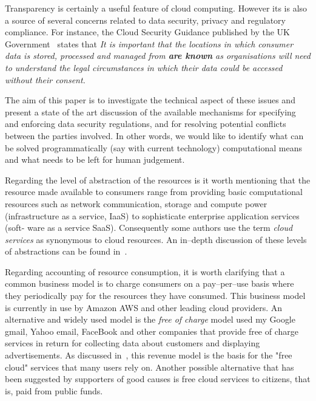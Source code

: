 \documentclass[runningheads,a4paper]{llncs}
\begin{document}
Transparency is certainly a useful feature of cloud computing. However
its is also a source of several concerns related to data security, privacy
and regulatory compliance. For instance, the Cloud Security Guidance
published by the UK Government~\cite{CSprinciples2014} states that
\emph{It is important that the locations in which consumer data is stored, 
      processed and managed from \textbf{are known} as organisations will need to 
      understand the legal circumstances in which their data could be accessed 
      without their consent.}
 
The aim of this paper is to investigate the technical aspect
of these issues and present a state of the art discussion of the available
mechanisms for specifying and enforcing data security regulations, and 
for resolving potential conflicts between the parties involved. In other
words, we would like to identify what can be solved programmatically
(say with current technology) computational means and what needs to be left for
human judgement. 

Regarding the level of abstraction of the resources is it worth mentioning 
that the resource made available to consumers
range from providing basic computational resources such
as network communication, storage and compute power (infrastructure as a service,
IaaS) to sophisticate enterprise application services (soft-
ware as a service SaaS).  Consequently some authors use the 
term \emph{cloud services} as synonymous to cloud resources.
An in--depth discussion of these levels of abstractions
can be found in~\cite{LeeBadger2011,MichaelArmbrust2009}. 

Regarding accounting of resource consumption, it is worth clarifying
that a common business model is to charge consumers on a 
pay--per--use basis where they periodically pay for the resources 
they have consumed. This business model is currently 
in use by Amazon AWS and other leading cloud providers. 
An alternative and widely used model is the \emph{free of charge}
model used my Google gmail, Yahoo email, FaceBook and other
companies that provide free of charge services in return
for collecting data about customers and displaying 
advertisements. As discussed in~\cite{leontiadis2012}, this 
revenue model is the basis for the "free cloud" services
that many users rely on.  Another
possible alternative that has been suggested by supporters
of good causes is free cloud services to citizens, that is,
paid from public funds. 
\end{document}
